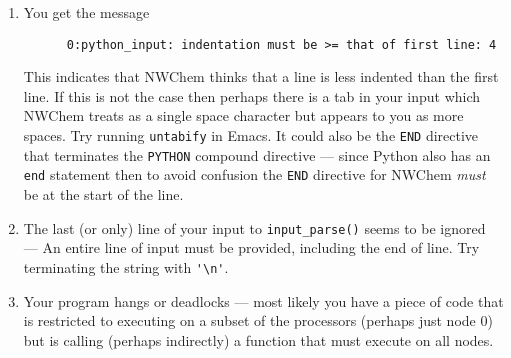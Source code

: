 \begin{enumerate}
\item You get the message
\begin{verbatim}
      0:python_input: indentation must be >= that of first line: 4
\end{verbatim}
This indicates that NWChem thinks that a line is less indented than
the first line.  If this is not the case then perhaps there is a tab
in your input which NWChem treats as a single space character but
appears to you as more spaces. Try running \verb+untabify+ in Emacs.
It could also be the \verb+END+ directive that terminates the
\verb+PYTHON+ compound directive --- since Python also has an
\verb+end+ statement then to avoid confusion the \verb+END+ directive
for NWChem {\em must} be at the start of the line.

\item The last (or only) line of your input to \verb+input_parse()+
seems to be ignored --- An entire line of input must be provided,
including the end of line.  Try terminating the string with
\verb+'\n'+.

\item Your program hangs or deadlocks --- most likely you have a piece
of code that is restricted to executing on a subset of the processors
(perhaps just node 0) but is calling (perhaps indirectly) a function
that must execute on all nodes.  

\end{enumerate}
